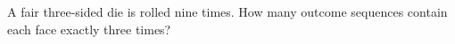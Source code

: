 A fair three-sided die is rolled nine times. How many outcome sequences contain each face exactly three times?
